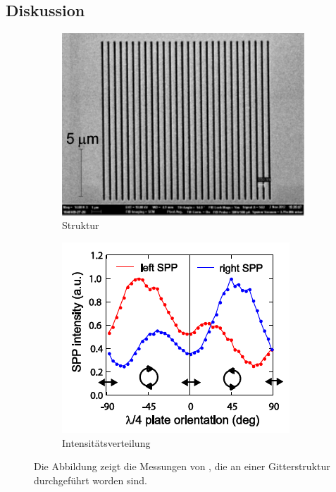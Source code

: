 \documentclass[titlepage,  ngerman]{article}
\begin{document}
	\subsection{Diskussion}
	
	
	\begin{figure}
		\label{fig:RF_measure}
		\centering
		\begin{subfigure}[b]{0.5\textwidth}
			\centering
			\includegraphics[width=\textwidth]{figures/RF_SM_Slits.pdf}
			\caption{Struktur}
			\label{fig:RF_measure_slits}
		\end{subfigure}
		\hfill
		\begin{subfigure}[b]{0.49\textwidth}
			\centering
			\includegraphics[width=\textwidth]{figures/RF_SM_Intensity.pdf}
			\caption{Intensitätsverteilung}
			\label{fig:RF_measure_int}
		\end{subfigure}
		\caption[Vergleichsmessung von \cite{RodriguezFortuno.2013}]{Die Abbildung zeigt die Messungen von \cite{RodriguezFortuno.2013}, die an einer Gitterstruktur durchgeführt worden sind.}			
	\end{figure}
	
\end{document}
